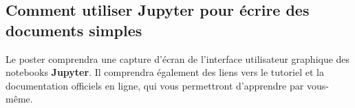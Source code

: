 \documentclass[runningheads]{llncs}
\newcommand{\Jupyter}{\textbf{Jupyter}}
\begin{document}
\subsection*{Comment utiliser \Jupyter{} pour écrire des documents simples}

Le poster comprendra une capture d'écran de l'interface utilisateur graphique des notebooks \Jupyter{}.
Il comprendra également des liens vers le tutoriel et la documentation officiels en ligne, qui vous permettront d'apprendre par vous-même.







\end{document}
